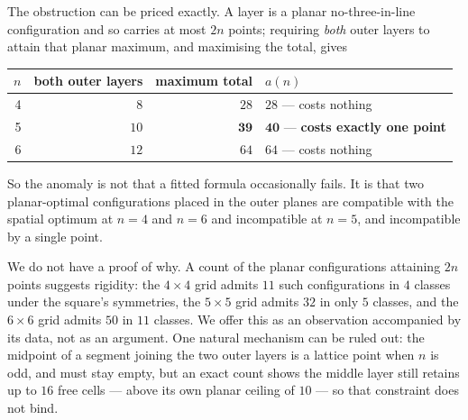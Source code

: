 \documentclass[11pt,a4paper]{article}
\begin{document}
The obstruction can be priced exactly.  A layer is a planar no-three-in-line configuration and so carries at
most $2n$ points; requiring \emph{both} outer layers to attain that planar maximum, and maximising the total,
gives
\begin{center}\begin{tabular}{rrrl}\toprule
$n$ & both outer layers & maximum total & $a(n)$\\\midrule
4 & $8$ & $28$ & $28$ --- costs nothing\\
5 & $10$ & $\mathbf{39}$ & $\mathbf{40}$ --- \textbf{costs exactly one point}\\
6 & $12$ & $64$ & $64$ --- costs nothing\\\bottomrule
\end{tabular}\end{center}
So the anomaly is not that a fitted formula occasionally fails.  It is that two planar-optimal configurations
placed in the outer planes are compatible with the spatial optimum at $n=4$ and $n=6$ and incompatible at
$n=5$, and incompatible by a single point.

We do not have a proof of why.  A count of the planar configurations attaining $2n$ points suggests rigidity:
the $4\times4$ grid admits $11$ such configurations in $4$ classes under the square's symmetries, the $5\times5$
grid admits $32$ in only $5$ classes, and the $6\times6$ grid admits $50$ in $11$ classes.  We offer this as an
observation accompanied by its data, not as an argument.  One natural mechanism can be ruled out: the midpoint
of a segment joining the two outer layers is a lattice point when $n$ is odd, and must stay empty, but an exact
count shows the middle layer still retains up to $16$ free cells --- above its own planar ceiling of $10$ --- so
that constraint does not bind.
\end{document}
